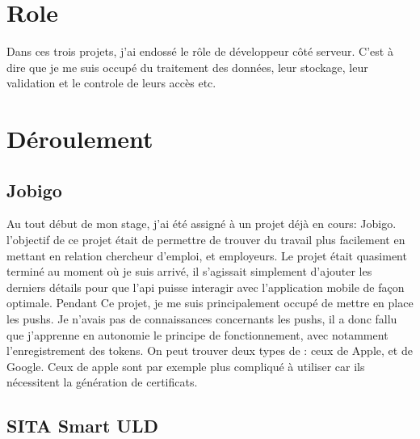 \documentclass[../rapport.tex]{subfiles}
\begin{document}
    \section{Role}
        Dans ces trois projets, j'ai endossé le rôle de développeur côté
        serveur. C'est à dire que je me suis occupé du traitement des données,
        leur stockage, leur validation et le controle de leurs accès etc.
    \section{Déroulement}
        \subsection{Jobigo}
        Au tout début de mon stage, j'ai été assigné à un projet déjà en cours: Jobigo. l'objectif de
        ce projet était de permettre de trouver du travail plus facilement
        en mettant en relation chercheur d'emploi, et employeurs.
        Le projet était quasiment terminé au moment où je suis arrivé, il s'agissait simplement d'ajouter
        les derniers détails pour que l'\gls{api} puisse interagir avec l'application mobile
        de façon optimale.
        Pendant Ce projet, je me suis principalement occupé de mettre en place les \glspl{push}.
        Je n'avais pas de connaissances concernants les \glspl{push}, il a donc fallu que 
        j'apprenne en autonomie le principe de fonctionnement, avec notamment l'enregistrement 
        des \glspl{token}. On peut trouver deux types de : ceux de Apple, et de Google.
        Ceux de apple sont par exemple plus compliqué à utiliser car ils nécessitent la génération 
        de certificats.

        \subsection{SITA Smart ULD}
\end{document}
